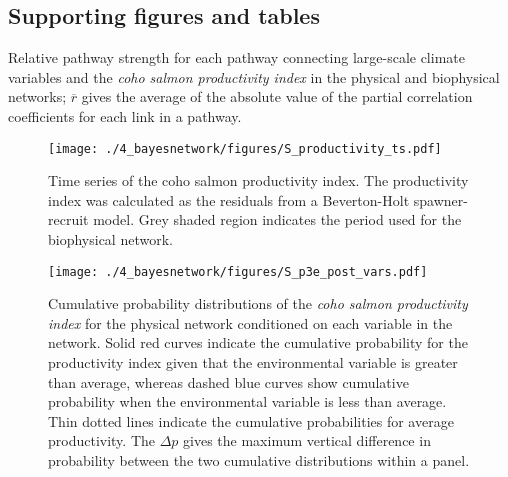 \subsection{Supporting figures and tables}

\begin{table}[htbp]
  \small \centering \libertineLF
  \caption[Relative pathway strength for each pathway connecting large-scale
           climate variables and the coho salmon productivity index.]{Relative
           pathway strength for each pathway connecting large-scale climate
           variables and the \emph{coho salmon productivity index} in the
           physical and biophysical networks; $\overline{r}$ gives the average
           of the absolute value of the partial correlation coefficients for
           each link in a pathway.}
  
  \label{tab:bn:s1}
\end{table}
\clearpage %



\begin{figure}[htbp]
  \centering \texttt{[image: ./4\_bayesnetwork/figures/S\_productivity\_ts.pdf]}
  \caption[Time series of the coho salmon productivity index.]{Time series of
           the coho salmon productivity index. The productivity index was
           calculated as the residuals from a Beverton-Holt spawner-recruit
           model. Grey shaded region indicates the period used for the
           biophysical network.}
  \label{fig:bn:s1}
\end{figure}

\begin{figure}[htbp]
  \centering \texttt{[image: ./4\_bayesnetwork/figures/S\_p3e\_post\_vars.pdf]}
  \caption[Cumulative probability distributions of the coho salmon
           productivity index for the physical network conditioned on each
           variable in the network.]{Cumulative probability distributions of the
           \emph{coho salmon productivity index} for the physical network
           conditioned on each variable in the network. Solid red curves
           indicate the cumulative probability for the productivity index given
           that the environmental variable is greater than average, whereas
           dashed blue curves show cumulative probability when the
           environmental variable is less than average. Thin dotted lines
           indicate the cumulative probabilities for average productivity. The
           \(\Delta p\) gives the maximum vertical difference in probability
           between the two cumulative distributions within a panel.}
  \label{fig:bn:s2}
\end{figure}

